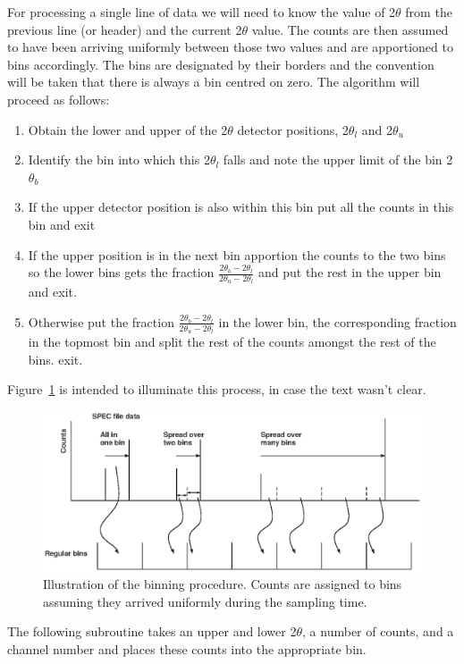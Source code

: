 \documentclass[10pt,a4paper,notitlepage]{article}
\begin{document}
For processing a single line of data we will need to know the value of 
2$\theta$ from the previous line (or header) and the current 2$\theta$ value. 
The counts are then assumed to have been arriving uniformly between those two
values and are apportioned to bins accordingly. 
The bins are designated by their borders and the convention will be taken that there is always a bin centred on zero. 
The algorithm will proceed as follows:
\begin{enumerate}
\item Obtain the lower and upper of the 2$\theta$ detector positions, 
2$\theta_l$ and 2$\theta_u$
\item Identify the bin into which this 2$\theta_l$ falls and note the upper
      limit of the bin 2$\theta_b$
\item If the upper detector position is also within this bin put all the counts
     in this bin and exit
\item If the upper position is in the next bin apportion the counts to the two
     bins so the lower bins gets the fraction 
      $\frac{2\theta_{b}-2\theta_l}{2\theta_{u}-2\theta_l}$
      and put the rest in the upper bin and exit.
\item Otherwise put the fraction 
        $\frac{2\theta_{b}-2\theta_l}{2\theta_{u}-2\theta_l}$
      in the lower bin, the corresponding fraction in the topmost bin
      and split the rest of the counts amongst the rest of the bins. exit.
\end{enumerate}

Figure~\ref{fig:binalg} is intended to illuminate this process, in case 
the text wasn't clear.
\begin{figure}[tb]
  \centering
  \includegraphics{binalg.eps}
  \caption{Illustration of the binning procedure. Counts are assigned to bins
   assuming they arrived uniformly during the sampling time.}
  \label{fig:binalg}
\end{figure}

The following subroutine takes an upper and lower 2$\theta$, a number of 
counts, and a channel number and places these counts into the appropriate bin.
\end{document}
